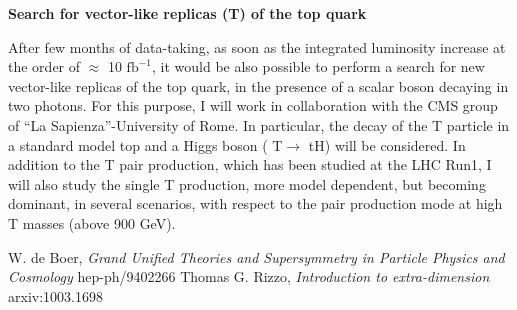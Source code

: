 \documentclass[a4paper,11pt]{article}
\begin{document}
\medskip
\large{\textbf{Search for vector-like replicas (T) of the top quark}}

\smallskip
After few months of data-taking, as soon as the integrated luminosity increase at the order of $\approx$ 10 $\textrm{fb}^{-1}$, it would be also possible to
perform a search for new vector-like replicas of the top quark, in the presence of a scalar boson 
decaying in two photons. 
For this purpose, I will work in collaboration with the CMS group of “La Sapienza”-University of Rome.
In particular, the decay of the T particle in a standard model top and a Higgs boson ( T$\rightarrow$ tH) will be considered.
In addition to the T pair production, which has been studied at the LHC Run1, I will also study the single T production, more model dependent, but
becoming dominant, in several scenarios, with respect to the pair production mode at high T masses (above 900 GeV).
 
\begin{thebibliography}{9}
W. de Boer, \textit{Grand Unified Theories and Supersymmetry in Particle Physics and Cosmology} hep-ph/9402266
\label{GUT}
Thomas G. Rizzo, \textit{Introduction to extra-dimension} arxiv:1003.1698
\label{ED}
\end{thebibliography}
\end{document}
